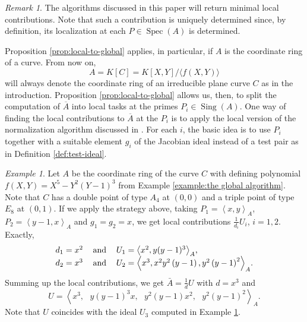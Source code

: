 \documentclass[a4paper,11pt]{amsart}%
\theoremstyle{definition}
\theoremstyle{plain}
\theoremstyle{remark}
\newtheorem{remark}[defn]{Remark}
\newtheorem{example}[defn]{Example}
\DeclareMathOperator{\Sing}{Sing}
\begin{document}
\begin{remark}
The algorithms discussed in this paper will return minimal local
contributions. Note that such a contribution is uniquely determined since, by
definition, its localization at each $P\in\operatorname*{Spec}(A)$ is determined.
\end{remark}

Proposition \ref{prop:local-to-global} applies, in particular, if $A$ is the 
coordinate ring of a curve. From now on, 
\[
A=K[C]=K[X,Y]/\langle f(X,Y)\rangle
\]
will always denote the coordinate ring of an irreducible plane curve $C$ as in 
the introduction. Proposition \ref{prop:local-to-global}
allows us, then,  to split the computation of $\overline{A}$
into local tasks at the primes $P_{i}\in\Sing(A)$. One way of
finding the local contributions to $\overline{A}$ at the $P_{i}$ is to apply the local version of the
normalization algorithm discussed in \cite{BDLPSS}. For each $i$, the basic
idea is to use $P_{i}$ together with a suitable element $g_{i}$ of the
Jacobian ideal instead of a test pair as in Definition \ref{def:test-ideal}.

\begin{example}
\label{example:localContribution} Let $A$ be the coordinate ring of the curve
$C$ with defining polynomial $f(X,Y)=X^{5} -Y^{2}(Y-1)^{3}$ from Example
\ref{example:the global algorithm}. Note that $C$ has a double point of type
$A_{4}$ at $(0,0)$ and a triple point of type $E_{8}$ at $(0,1)$. If we apply
the strategy above, taking $P_{1}=\left\langle x,y\right\rangle _{A}$,
$P_{2}=\left\langle y - 1, x\right\rangle _{A}$ and $g_{1} = g_{2} = x$, we
get local contributions $\frac{1}{d_{i}} U_{i}$, $i =1, 2$. Exactly,
\[%
\begin{tabular}
[c]{lll}%
$d_{1}=x^{2}$ & and & $U_{1}=\left\langle x^{2}, y(y-1)^{3}\right\rangle _{A}%
$,\\
$d_{2}=x^{3}$ & and & $U_{2}=\left\langle x^{3}, x^{2}y^{2}\left(  y-1\right)
, y^{2}\left(  y-1\right)  ^{2}\right\rangle _{A}$.
\end{tabular}
\]
Summing up the local contributions, we get $\bar A = \frac{1}{d}U$ with
$d=x^{3}$ and
\[
U=\left\langle x^{3},\text{ }y(y-1)^{3}x,\text{ }y^{2}\left(  y-1\right)
x^{2} ,\text{ }y^{2}\left(  y-1\right)  ^{2}\right\rangle _{A}\text{.}%
\]
Note that $U$ coincides with the ideal $U_{3}$ computed in Example
\ref{example:localContribution}.
\end{example}
\end{document}
